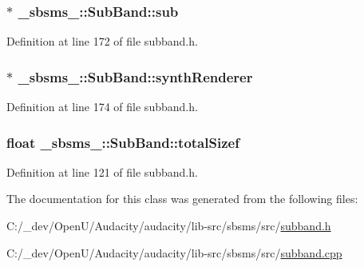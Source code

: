 \subsubsection[{\texorpdfstring{sub}{sub}}]{$\ast$ \+\_\+sbsms\+\_\+\+::\+Sub\+Band\+::sub\hspace{0.3cm}{\ttfamily [protected]}}\hypertarget{class__sbsms___1_1_sub_band_a1e1a1206dff7e31fff824706ed967883}{}\label{class__sbsms___1_1_sub_band_a1e1a1206dff7e31fff824706ed967883}


Definition at line 172 of file subband.\+h.

\subsubsection[{\texorpdfstring{synth\+Renderer}{synthRenderer}}]{$\ast$ \+\_\+sbsms\+\_\+\+::\+Sub\+Band\+::synth\+Renderer\hspace{0.3cm}{\ttfamily [protected]}}\hypertarget{class__sbsms___1_1_sub_band_a2f671c875a6dd97967ad97e40c3cab8c}{}\label{class__sbsms___1_1_sub_band_a2f671c875a6dd97967ad97e40c3cab8c}


Definition at line 174 of file subband.\+h.

\subsubsection[{\texorpdfstring{total\+Sizef}{totalSizef}}]{\setlength{\rightskip}{0pt plus 5cm}float \+\_\+sbsms\+\_\+\+::\+Sub\+Band\+::total\+Sizef\hspace{0.3cm}{\ttfamily [protected]}}\hypertarget{class__sbsms___1_1_sub_band_a933d3f8be98c9ad3bc003fa37ac9bcd2}{}\label{class__sbsms___1_1_sub_band_a933d3f8be98c9ad3bc003fa37ac9bcd2}


Definition at line 121 of file subband.\+h.



The documentation for this class was generated from the following files\+:\begin{DoxyCompactItemize}
\item 
C\+:/\+\_\+dev/\+Open\+U/\+Audacity/audacity/lib-\/src/sbsms/src/\hyperlink{sbsms_2src_2subband_8h}{subband.\+h}\item 
C\+:/\+\_\+dev/\+Open\+U/\+Audacity/audacity/lib-\/src/sbsms/src/\hyperlink{subband_8cpp}{subband.\+cpp}\end{DoxyCompactItemize}

